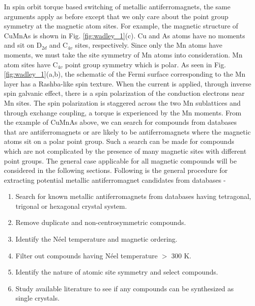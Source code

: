 \documentclass[10pt,doublespacing,edeposit]{uiucthesis2020}
\begin{document}
\begin{mainmatter}
In spin orbit torque based switching of metallic antiferromagnets, the same arguments apply as before except that we only care about the point group symmetry at the magnetic atom sites. For example, the magnetic structure of CuMnAs is shown in Fig. \ref{fig:wadley_1}(c). Cu and As atoms have no moments and sit on D$_{2d}$ and C$_{4v}$ sites, respectively. Since only the Mn atoms have moments, we must take the site symmetry of Mn atoms into consideration. Mn atom sites have C$_{4v}$ point group symmetry which is polar. As seen in Fig. \ref{fig:wadley_1}(a,b), the schematic of the Fermi surface corresponding to the Mn layer has a Rashba-like spin texture. When the current is applied, through inverse spin galvanic effect, there is a spin polarization of the conduction electrons near Mn sites. The spin polarization is staggered across the two Mn sublattices and through exchange coupling, a torque is experienced by the Mn moments. From the example of CuMnAs above, we can search for compounds from databases that are antiferromagnets or are likely to be antiferromagnets where the magnetic atoms sit on a polar point group. Such a search can be made for compounds which are not complicated by the presence of many magnetic sites with different point groups. The general case applicable for all magnetic compounds will be considered in the following sections. Following is the general procedure for extracting potential metallic antiferromagnet candidates from databases -

\begin{enumerate}
\item Search for known metallic antiferromagnets from databases having tetragonal, trigonal or hexagonal crystal system.
\item Remove duplicate and non-centrosymmetric compounds.
\item Identify the Néel temperature and magnetic ordering.
\item Filter out compounds having Néel temperature $>$ 300 K.
\item Identify the nature of atomic site symmetry and select compounds.
\item Study available literature to see if any compounds can be synthesized as single crystals.
\end{enumerate}


\end{mainmatter}
\end{document}
